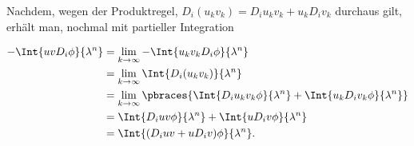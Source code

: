 \begin{solution}
Nachdem, wegen der Produktregel, $D_i(u_k v_k) = D_i u_k v_k + u_k D_i v_k$ durchaus gilt, erhält man, nochmal mit partieller Integration

\begin{align*}
  - \Int{uv D_i \phi}{\lambda^n}
  & = \lim_{k \to \infty} - \Int{u_k v_k D_i \phi}{\lambda^n} \\
  & = \lim_{k \to \infty} \Int{D_i(u_k v_k)}{\lambda^n} \\
  & = \lim_{k \to \infty}
      \pbraces
      {
        \Int{D_i u_k v_k \phi}{\lambda^n} +
        \Int{u_k D_i v_k \phi}{\lambda^n}
      } \\
  & = \Int{D_i u v \phi}{\lambda^n} +
      \Int{u D_i v \phi}{\lambda^n} \\
  & = \Int{(D_i u v + u D_i v) \phi}{\lambda^n}.
\end{align*}


\end{solution}
